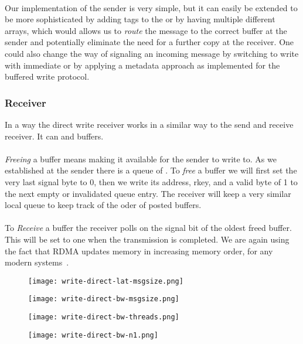 \paragraph{} Our implementation of the sender is very simple, but it can easily be extended to be more sophisticated by adding
tags to the  or by having multiple different arrays, which would allows us to \emph{route} the message to the
correct buffer at the sender and potentially eliminate the need for a further copy at the receiver. One could also change
the way of signaling an incoming message by switching to write with immediate or by applying a metadata approach as implemented
for the buffered write protocol.

\subsubsection{Receiver}

In a way the direct write receiver works in a similar way to the send and receive receiver. It can  and 
 buffers. 

\paragraph{}\emph{Freeing} a buffer means making it available for the sender to write to. As we established at the sender 
there is a queue of . To \emph{free} a buffer we will first set the very last signal byte to 0, then we
write its address, rkey, and a valid byte of 1 to the next empty or invalidated queue entry. The receiver will keep a very 
similar local queue to keep track of the oder of posted buffers.

\paragraph{} To \emph{Receive} a buffer the receiver polls on the signal bit of the oldest freed buffer. This will be set
to one when the transmission is completed. We are again using the fact that RDMA updates memory in increasing memory order, 
for any modern systems~\cite{herd, farm}.


\begin{figure}[htp]
\texttt{[image: write-direct-lat-msgsize.png]}
\label{fig:plot-wdir-lat}
\end{figure}


\begin{figure}[htp]
\texttt{[image: write-direct-bw-msgsize.png]}
\label{fig:plot-wdir-bw}
\end{figure}



\begin{figure}[htp]
\texttt{[image: write-direct-bw-threads.png]}
\label{fig:plot-wdir-bw-threads}
\end{figure}


\begin{figure}[htp]
\texttt{[image: write-direct-bw-n1.png]}
\label{fig:plot-wdir-bw-n1}
\end{figure}
